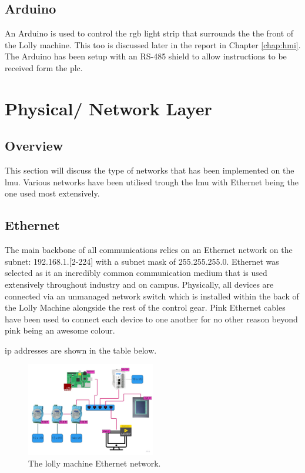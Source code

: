     
    
    \subsection{Arduino}
    An Arduino is used to control the \acrshort{rgb} light strip that surrounds the the front of the Lolly machine. This too is discussed later in the report in Chapter \ref{chap:hmi}. The Arduino has been setup with an RS-485 shield to allow instructions to be received form the \acrshort{plc}.
    
    \section{Physical/ Network Layer}
    
    \subsection{Overview}
    This section will discuss the type of networks that has been implemented on the \acrshort{lmu}. Various networks have been utilised trough the \acrshort{lmu} with Ethernet being the one used most extensively.
    
    \subsection{Ethernet} 
    The main backbone of all communications relies on an Ethernet network on the subnet: 192.168.1.[2-224] with a subnet mask of 255.255.255.0. Ethernet was selected as it an incredibly common communication medium that is used extensively throughout industry and on campus. Physically, all devices are connected via an unmanaged network switch which is installed within the back of the Lolly Machine alongside the rest of the control gear. Pink Ethernet cables have been used to connect each device to one another for no other reason beyond pink being an awesome colour.
    
    \acrshort{ip} addresses are shown in the table below.	

        \begin{figure}[H]
            \centering
            \includegraphics[width = 0.5\textwidth]{2_images/ethernetLollyMachine.png}
            \caption{The lolly machine Ethernet network.}
            \label{fig:ethernetLollyMachine}
        \end{figure}
    
